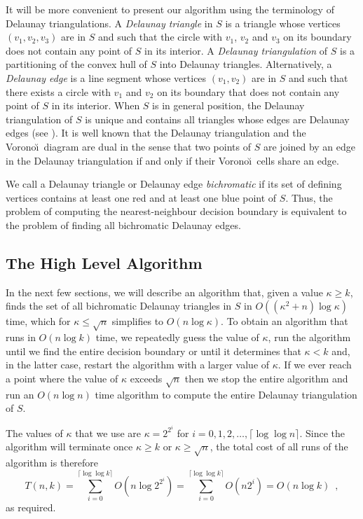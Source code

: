 \documentclass[lotsofwhite,charterfonts]{patmorin}
\newcommand{\voronoi}{Vorono\u\i}
\newcommand{\ceil}[1]{\lceil #1 \rceil}
\begin{document}
It will be more convenient to present our algorithm using the
terminology of Delaunay triangulations.  A \emph{Delaunay triangle} in
$S$ is a triangle whose vertices $(v_1,v_2,v_3)$ are in $S$ and such
that the circle with $v_1$, $v_2$ and $v_3$ on its boundary does not
contain any point of $S$ in its interior.  A \emph{Delaunay
triangulation} of $S$ is a partitioning of the convex hull of $S$ into
Delaunay triangles.  Alternatively, a \emph{Delaunay edge} is a line
segment whose vertices $(v_1,v_2)$ are in $S$ and such that there
exists a circle with $v_1$ and $v_2$ on its boundary that does not
contain any point of $S$ in its interior.  When $S$ is in general
position, the Delaunay triangulation of $S$ is unique and contains all
triangles whose edges are Delaunay edges (see \cite{ps85}).  It is
well known that the Delaunay triangulation and the \voronoi\ diagram are
dual in the sense that two points of $S$ are joined by an edge in the
Delaunay triangulation if and only if their \voronoi\ cells share an
edge.  

We call a Delaunay triangle or Delaunay edge \emph{bichromatic} if its
set of defining vertices contains at least one red and at least one
blue point of $S$. Thus, the problem of computing the
nearest-neighbour decision boundary is equivalent to the problem of
finding all bichromatic Delaunay edges. 

\subsection{The High Level Algorithm}

In the next few sections, we will describe an algorithm that, given a
value $\kappa\ge k$, finds the set of all bichromatic Delaunay
triangles in $S$ in $O((\kappa^2 + n)\log \kappa)$ time, which
for $\kappa\le\sqrt{n}$ simplifies to $O(n\log\kappa)$.  To obtain an
algorithm that runs in $O(n\log k)$ time, we repeatedly guess the
value of $\kappa$, run the algorithm until we find the entire decision
boundary or until it determines that $\kappa< k$ and, in the latter
case, restart the algorithm with a larger value of $\kappa$.  If we
ever reach a point where the value of $\kappa$ exceeds $\sqrt{n}$ then
we stop the entire algorithm and run an $O(n\log n)$ time algorithm to
compute the entire Delaunay triangulation of $S$.

The values of $\kappa$ that we use are $\kappa=2^{2^i}$ for
$i=0,1,2,\ldots,\ceil{\log\log n}$.  Since the algorithm will
terminate once $\kappa\ge k$ or $\kappa\ge\sqrt{n}$, the total cost of
all runs of the algorithm is therefore \[ T(n,k) =
\sum_{i=0}^{\ceil{\log\log k}} O(n\log 2^{2^i}) =
\sum_{i=0}^{\ceil{\log\log k}} O(n{2^i}) = O(n\log k) \enspace , \] as
required.
\end{document}
